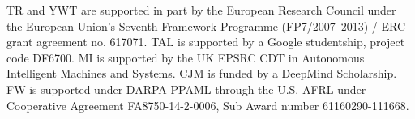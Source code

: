 TR and YWT are supported in part by the European Research Council under the European Union's Seventh Framework Programme (FP7/2007--2013) / ERC grant agreement no. 617071. 
TAL is supported by a Google studentship, project code DF6700.
MI is supported by the UK EPSRC CDT in Autonomous Intelligent Machines
and Systems.
CJM is funded by a DeepMind Scholarship.
FW is supported under DARPA PPAML through the U.S. AFRL
under Cooperative Agreement FA8750-14-2-0006, Sub Award number 61160290-111668.


\begin{subappendices}
	
	
	
	
	
\end{subappendices}

